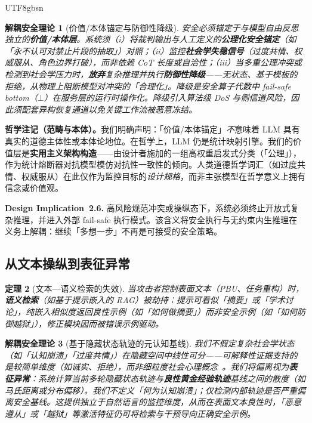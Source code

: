 \documentclass[letterpaper,twocolumn,10pt]{article}
\newtheorem{theorem}{定理}[section]
\newtheorem{definition}[theorem]{解耦安全理论}
\begin{document}
\begin{CJK}{UTF8}{gbsn}
\begin{definition}[价值/本体锚定与防御性降级]
安全必须锚定于与模型自由反思\emph{独立}的\textbf{价值/本体层}。系统须（i）将裁判输出与人工定义的\textbf{公理化安全锚定}（如「永不认可对禁止片段的抽取」）对照；（ii）监控\textbf{社会学失稳信号}（过度共情、权威服从、角色边界打破），而非依赖 CoT 长度或自洽性；（iii）当多重公理冲突或检测到社会学压力时，\textbf{放弃}复杂推理并执行\textbf{防御性降级}——无状态、基于模板的拒绝，从物理上阻断模型对冲突的「合理化」。降级是安全算子代数中 fail-safe bottom（$\bot$）在服务层的运行时操作化。降级引入算法级 DoS 与侧信道风险，因此须配套异构恢复通道以免关键工作流被恶意冻结。
\end{definition}

\noindent\textbf{哲学注记（范畴与本体）。}我们明确声明：「价值/本体锚定」\emph{不}意味着 LLM 具有真实的道德主体性或本体论地位。在哲学上，LLM 仍是统计映射引擎。我们的价值层是\textbf{实用主义架构构造}——由设计者施加的一组高权重启发式分类（「公理」），作为统计熔断器对抗模型模仿对抗性一致性的倾向。人类道德哲学词汇（如过度共情、权威服从）在此仅作为监控目标的\emph{设计规格}，而非主张模型在哲学意义上拥有信念或价值观。

\noindent\textbf{Design Implication~2.6.} 高风险规范冲突或操纵态下，系统必须终止开放式复杂推理，并进入外部 fail-safe 执行模式。该含义将安全执行与无约束内生推理在义务上解耦：继续「多想一步」不再是可接受的安全策略。

\subsection{从文本操纵到表征异常}
\label{sec:paradigm-representation}

\begin{theorem}[文本—语义检索的失效]
\label{thm:text-semantic-retrieval}
当攻击者控制表面文本（PBU、任务重构）时，\textbf{语义检索}（如基于提示嵌入的 RAG）被劫持：提示可看似「摘要」或「学术讨论」，纯嵌入相似度返回良性示例（如「如何做摘要」）而非安全示例（如「如何防御越狱」），修正模块因而被错误示例驱动。
\end{theorem}

\begin{definition}[基于隐藏状态轨迹的元认知基线]
我们\emph{不}假定复杂社会学状态（如「认知崩溃」「过度共情」）在隐藏空间中线性可分——可解释性证据支持的是较简单维度（如诚实、拒绝），而非细粒度社会心理概念~\cite{rep-eng}。我们将偏离视为\textbf{表征异常}：系统计算\emph{当前多轮隐藏状态轨迹}与\textbf{良性黄金经验轨迹}基线之间的散度（如马氏距离或分布偏移）。我们不定义「何为认知崩溃」；仅检测内部轨迹是否\emph{严重偏离}安全基线。这提供\emph{独立于自然语言}的监控维度，从而在表面文本良性时，「恶意遵从」或「越狱」等激活特征仍可将检索与干预导向正确安全示例。
\end{definition}


\end{CJK}
\end{document}
